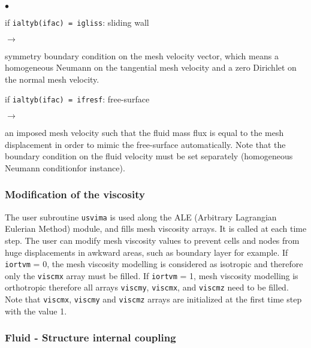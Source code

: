 {{{\begin{list}{$\bullet$}{}
 \item if \texttt{ialtyb(ifac) = igliss}: sliding wall
\begin{list}{$\rightarrow$}{}
\item symmetry boundary condition on the mesh velocity vector, which means a homogeneous Neumann on the tangential mesh velocity and a zero Dirichlet on the normal mesh velocity.
\end{list}

 \item if \texttt{ialtyb(ifac) = ifresf}: free-surface
\begin{list}{$\rightarrow$}{}
\item an imposed mesh velocity such that the fluid mass flux is equal to the mesh displacement in order to mimic the free-surface automatically. Note that the boundary condition on the fluid velocity must be set separately (homogeneous Neumann conditionfor instance).
\end{list}

\end{list}
}

\subsubsection{Modification of the viscosity}

The user subroutine \texttt{usvima} is used along the ALE (Arbitrary Lagrangian Eulerian
 Method) module, and fills mesh viscosity arrays. It is called at each time step.
The user can modify mesh viscosity values to prevent cells and nodes from huge
 displacements in awkward areas, such as boundary layer for example.
If \texttt{iortvm} = 0, the mesh viscosity modelling is considered as isotropic and
 therefore only the \texttt{viscmx} array must be filled.
If \texttt{iortvm} = 1, mesh viscosity modelling is orthotropic therefore all arrays
 \texttt{viscmy}, \texttt{viscmx}, and \texttt{viscmz} need to be filled.
Note that \texttt{viscmx}, \texttt{viscmy} and \texttt{viscmz} arrays are initialized
 at the first time step with the value 1.

\subsubsection{Fluid - Structure internal coupling}\label{sec:ALE}

}}
